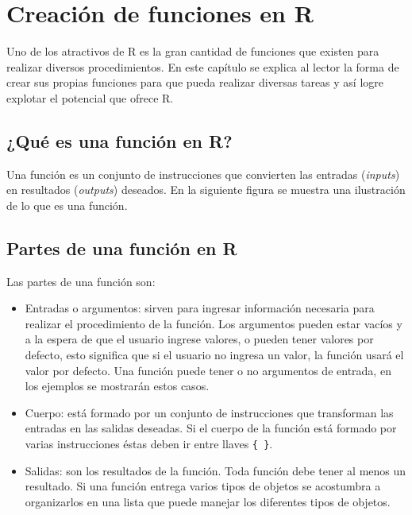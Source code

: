 \documentclass[
]{book}
\providecommand{\tightlist}{%
  \setlength{\itemsep}{0pt}\setlength{\parskip}{0pt}}
\begin{document}
\hypertarget{creafun}{%
\chapter{Creación de funciones en R}\label{creafun}}

Uno de los atractivos de R es la gran cantidad de funciones que existen para realizar diversos procedimientos. En este capítulo se explica al lector la forma de crear sus propias funciones para que pueda realizar diversas tareas y así logre explotar el potencial que ofrece R.

\hypertarget{quuxe9-es-una-funciuxf3n-en-r}{%
\section{¿Qué es una función en R?}\label{quuxe9-es-una-funciuxf3n-en-r}}

Una función es un conjunto de instrucciones que convierten las entradas (\emph{inputs}) en resultados (\emph{outputs}) deseados. En la siguiente figura se muestra una ilustración de lo que es una función.

\hypertarget{partes-de-una-funciuxf3n-en-r}{%
\section{Partes de una función en R}\label{partes-de-una-funciuxf3n-en-r}}

Las partes de una función son:

\begin{itemize}
\tightlist
\item
  Entradas o argumentos: sirven para ingresar información necesaria para realizar el procedimiento de la función. Los argumentos pueden estar vacíos y a la espera de que el usuario ingrese valores, o pueden tener valores por defecto, esto significa que si el usuario no ingresa un valor, la función usará el valor por defecto. Una función puede tener o no argumentos de entrada, en los ejemplos se mostrarán estos casos.
\item
  Cuerpo: está formado por un conjunto de instrucciones que transforman las entradas en las salidas deseadas. Si el cuerpo de la función está formado por varias instrucciones éstas deben ir entre llaves \texttt{\{\ \}}.
\item
  Salidas: son los resultados de la función. Toda función debe tener al menos un resultado. Si una función entrega varios tipos de objetos se acostumbra a organizarlos en una lista que puede manejar los diferentes tipos de objetos.
\end{itemize}
\end{document}
